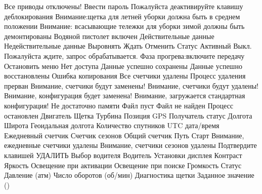  {Все приводы отключены!}
 {Ввести пароль}
 {Пожалуйста деактивируйте клавишу деблокирования}
 {Внимание:щетка для летней уборки должна быть в среднем положении}
 {Внимание: всасывающие тележки для уборки зимой должны быть демонтированы}
 {Водяной пистолет включен}
 {Действительные данные}
 {Недействительные данные}
 {Выровнять}
 {Ждать}
 {Отменить}
 {Статус}
 {Активный}
 {Выкл.}
 {Пожалуйста ждите, запрос обрабатывается.}
 {Фаза прогрева:включите передачу}
 {Остановить меню}
 {Нет доступа}
 {Данные успешно сохранены}
 {Данные успешно восстановлены}
 {Ошибка копирования}
 {Все счетчики удалены}
 {Процесс удаления прерван}
 {Внимание, счетчики будут заменены!}
 {Внимание, счетчики будут удалены!}
 {Внимание, конфигурация будет заменена!}
 {Внимание, загружается стандартная конфигурация!}
 {Не достаточно памяти}
 {Файл пуст}
 {Файл не найден}
 {Процесс остановлен}
 {Двигатель}
 {Щетка}
 {Турбина}
 {Позиция GPS}
 {Получатель статус}
 {Долгота}
 {Широта}
 {Геоидальная долгота}
 {Количество спутников}
 {UTC дата/время}
 {Ежедневный счетчик}
 {Счетчик сезонов}
 {Общий счетчик}
 {Путь}
 {Старт}
 {Внимание, ежедневные счетчики удалены}
 {Внимание, счетчики сезонов удалены}
 {Подтвердите клавишей УДАЛИТЬ}
 {Выбор водителя}
 {Водитель}
 {Установки дисплея}
 {Контраст}
 {Яркость}
 {Освещение при активации}
 {Освещение при поиске}
 {Громкость}
 {Статус}
 {Давление (атм)}
 {Число оборотов (об/мин)}
 {Диагностика щетки}
 {Заданное значение (\percent )}
